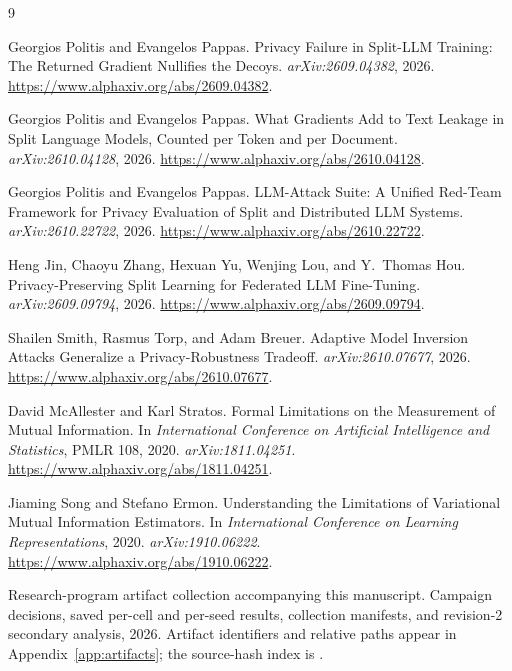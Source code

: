 \begin{thebibliography}{9}
\raggedright
{}
Georgios Politis and Evangelos Pappas.
Privacy Failure in Split-LLM Training: The Returned Gradient Nullifies the Decoys.
\emph{arXiv:2609.04382}, 2026.
\url{https://www.alphaxiv.org/abs/2609.04382}.

Georgios Politis and Evangelos Pappas.
What Gradients Add to Text Leakage in Split Language Models, Counted per Token and per Document.
\emph{arXiv:2610.04128}, 2026.
\url{https://www.alphaxiv.org/abs/2610.04128}.

Georgios Politis and Evangelos Pappas.
LLM-Attack Suite: A Unified Red-Team Framework for Privacy Evaluation of Split and Distributed LLM Systems.
\emph{arXiv:2610.22722}, 2026.
\url{https://www.alphaxiv.org/abs/2610.22722}.

Heng Jin, Chaoyu Zhang, Hexuan Yu, Wenjing Lou, and Y.\ Thomas Hou.
Privacy-Preserving Split Learning for Federated LLM Fine-Tuning.
\emph{arXiv:2609.09794}, 2026.
\url{https://www.alphaxiv.org/abs/2609.09794}.

Shailen Smith, Rasmus Torp, and Adam Breuer.
Adaptive Model Inversion Attacks Generalize a Privacy-Robustness Tradeoff.
\emph{arXiv:2610.07677}, 2026.
\url{https://www.alphaxiv.org/abs/2610.07677}.

David McAllester and Karl Stratos.
Formal Limitations on the Measurement of Mutual Information.
In \emph{International Conference on Artificial Intelligence and Statistics},
PMLR 108, 2020. \emph{arXiv:1811.04251}.
\url{https://www.alphaxiv.org/abs/1811.04251}.

Jiaming Song and Stefano Ermon.
Understanding the Limitations of Variational Mutual Information Estimators.
In \emph{International Conference on Learning Representations}, 2020.
\emph{arXiv:1910.06222}.
\url{https://www.alphaxiv.org/abs/1910.06222}.

Research-program artifact collection accompanying this manuscript.
Campaign decisions, saved per-cell and per-seed results, collection manifests,
and revision-2 secondary analysis, 2026.
Artifact identifiers and relative paths appear in Appendix~\ref{app:artifacts};
the source-hash index is .
\end{thebibliography}
